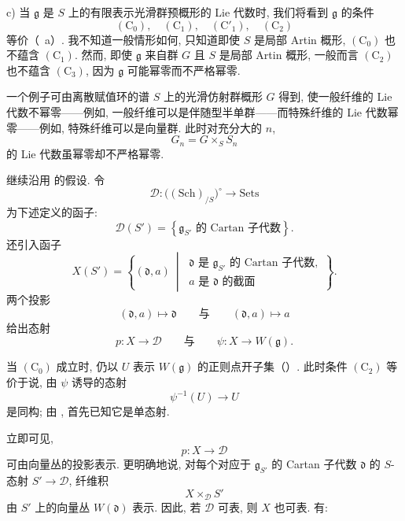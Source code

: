 \smallskip
\noindent
\textup{c)}
当 \(\mathfrak g\) 是 \(S\) 上的有限表示光滑群预概形的 Lie 代数时, 我们将看到 \(\mathfrak g\) 的条件
\[
  (\mathrm C_0),\quad(\mathrm C_1),\quad
  (\mathrm C'_1),\quad(\mathrm C_2)
\]
等价\textup{（~a）}. 我不知道一般情形如何, 只知道即使 \(S\) 是局部 Artin 概形, \((\mathrm C_0)\) 也不蕴含 \((\mathrm C_1)\). 然而, 即使 \(\mathfrak g\) 来自群 \(G\) 且 \(S\) 是局部 Artin 概形, 一般而言 \((\mathrm C_2)\) 也不蕴含 \((\mathrm C_3)\), 因为 \(\mathfrak g\) 可能幂零而不严格幂零.

一个例子可由离散赋值环的谱 \(S\) 上的光滑仿射群概形 \(G\) 得到, 使一般纤维的 Lie 代数不幂零——例如, 一般纤维可以是伴随型半单群——而特殊纤维的 Lie 代数幂零——例如, 特殊纤维可以是向量群. 此时对充分大的 \(n\),
\[
  G_n=G\times_S S_n
\]
的 Lie 代数虽幂零却不严格幂零.



继续沿用  的假设. 令
\[
  \mathcal D\colon
  \bigl((\mathrm{Sch})_{/S}\bigr)^\circ
  \longrightarrow \mathrm{Sets}
\]
为下述定义的函子:
\[
  \mathcal D(S')
  =\left\{
    \mathfrak g_{S'}\text{ 的 Cartan 子代数}
   \right\}.
\]
还引入函子
\[
  X(S')
  =\left\{
    (\mathfrak d,a)\ \middle|\
    \begin{array}{l}
      \mathfrak d\text{ 是 }\mathfrak g_{S'}\text{ 的 Cartan 子代数},\\
      a\text{ 是 }\mathfrak d\text{ 的截面}
    \end{array}
   \right\}.
\]
两个投影
\[
  (\mathfrak d,a)\longmapsto\mathfrak d
  \qquad\text{与}\qquad
  (\mathfrak d,a)\longmapsto a
\]
给出态射
\[
  p\colon X\longrightarrow\mathcal D
  \qquad\text{与}\qquad
  \psi\colon X\longrightarrow W(\mathfrak g).
\]

当 \((\mathrm C_0)\) 成立时, 仍以 \(U\) 表示 \(W(\mathfrak g)\) 的正则点开子集\textup{（）}. 此时条件 \((\mathrm C_2)\) 等价于说, 由 \(\psi\) 诱导的态射
\[
  \psi^{-1}(U)\longrightarrow U
\]
是同构; 由 , 首先已知它是单态射.

立即可见,
\[
  p\colon X\longrightarrow\mathcal D
\]
可由向量丛的投影表示. 更明确地说, 对每个对应于 \(\mathfrak g_{S'}\) 的 Cartan 子代数 \(\mathfrak d\) 的 \(S\)-态射 \(S'\to\mathcal D\), 纤维积
\[
  X\times_{\mathcal D}S'
\]
由 \(S'\) 上的向量丛 \(W(\mathfrak d)\) 表示. 因此, 若 \(\mathcal D\) 可表, 则 \(X\) 也可表. 有:


